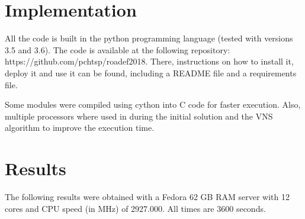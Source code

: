 \documentclass{roadef}
\begin{document}
\section{Implementation}

    All the code is built in the python programming language (tested with versions 3.5 and 3.6). The code is available at the following repository: https://github.com/pchtsp/roadef2018. There, instructions on how to install it, deploy it and use it can be found, including a README file and a requirements file.

    Some modules were compiled using cython into C code for faster execution. Also, multiple processors where used in during the initial solution and the VNS algorithm to improve the execution time.

\section{Results}

The following results were obtained with a Fedora 62 GB RAM server with 12 cores and CPU speed (in MHz) of 2927.000. All times are 3600 seconds.




\end{document}
